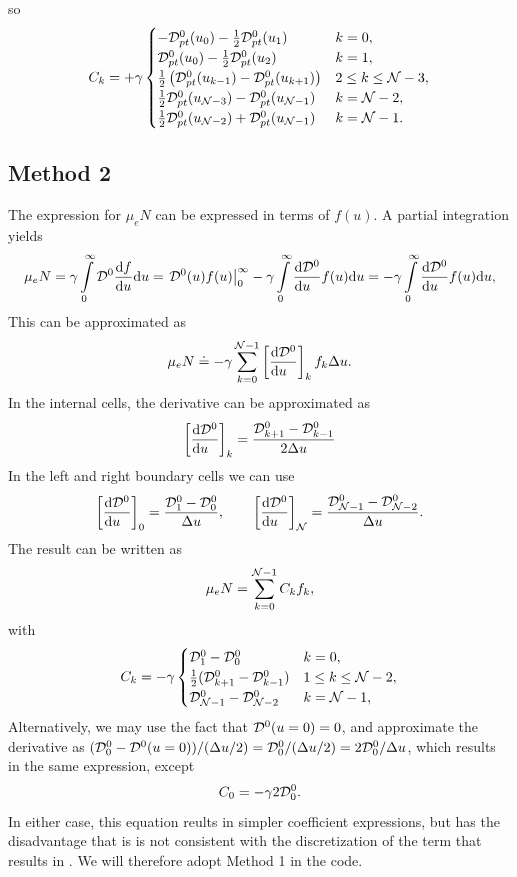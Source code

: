 \documentclass{book}
\begin{document}
so
\begin{equation}
	C_k = +\gamma\begin{cases}
			-{\cal D}_{pt}^0(u_0) - \frac{1}{2}{\cal D}_{pt}^0(u_1)          & k=0, \\
			 {\cal D}_{pt}^0(u_0) - \frac{1}{2}{\cal D}_{pt}^0(u_2)          & k=1, \\
			 \frac{1}{2}\left({\cal D}_{pt}^0(u_{k-1}) - {\cal D}_{pt}^0(u_{k+1})\right)  & 2\leq k \leq {{\cal N}-3}, \\
			 \frac{1}{2}{\cal D}_{pt}^0(u_{{\cal N}-3}) - {\cal D}_{pt}^0(u_{{\cal N}-1}) & k={{\cal N}-2}, \\
			 \frac{1}{2}{\cal D}_{pt}^0(u_{{\cal N}-2}) + {\cal D}_{pt}^0(u_{{\cal N}-1}) & k={{\cal N}-1}.
	\end{cases}
\end{equation}

\subsection*{Method 2}
The expression for $\mu_eN$ can be expressed in terms of $f(u)$. A partial integration yields
\[
	\mu_eN
		= \gamma\int\limits_0^\infty {\cal D}^0 \DERIV{f}{u}\dd{u}
		= \left. {\cal D}^0(u)f(u)\right|_0^\infty - \gamma\int\limits_0^\infty \DERIV{{\cal D}^0}{u} f(u)\dd{u}
		=  - \gamma\int\limits_0^\infty \DERIV{{\cal D}^0}{u} f(u)\dd{u},
\]
This can be approximated as
\[
	\mu_eN \doteq -\gamma\sum\limits_{k=0}^{{\cal N}-1}\left[\DERIV{{\cal D}^0}{u}\right]_kf_k\Delta u.
\]
In the internal cells, the derivative can be approximated as
\[
	\left[\DERIV{{\cal D}^0}{u}\right]_k = \frac{{\cal D}^0_{k+1}-{\cal D}^0_{k-1}}{2\Delta u}
\]
In the left and right boundary cells we can use
\[
	\left[\DERIV{{\cal D}^0}{u}\right]_0 = \frac{{\cal D}^0_{1}-{\cal D}^0_{0}}{\Delta u},
	\quad
	\quad
	\left[\DERIV{{\cal D}^0}{u}\right]_{\cal N} = \frac{{\cal D}^0_{{\cal N}-1}-{\cal D}^0_{{\cal N}-2}}{\Delta u}.
\]
The result can be written as
\begin{equation}
	\mu_eN = \sum\limits_{k=0}^{{\cal N}-1}C_kf_k,
\end{equation}
with
\begin{equation}
	C_k = -\gamma\begin{cases}
			{\cal D}^0_{1}-{\cal D}^0_{0} & k=0, \\
			\frac{1}{2}({\cal D}^0_{k+1}-{\cal D}^0_{k-1}) & 1\leq k \leq {{\cal N}-2}, \\
			{\cal D}^0_{{\cal N}-1}-{\cal D}^0_{{\cal N}-2} & k={{\cal N}-1},
	\end{cases}
\end{equation}
Alternatively, we may use the fact that ${\cal D}^0(u=0)=0$, and approximate the derivative as
$({\cal D}^0_{0}-{\cal D}^0(u=0))/(\Delta u/2) ={\cal D}^0_{0}/(\Delta u/2)=2{\cal D}^0_{0}/\Delta u$,
which results in the same expression, except
\[
	C_0 = -\gamma 2{\cal D}^0_{0}.
\]
In either case, this equation reults in simpler coefficient expressions, but has the disadvantage that
is is not consistent with the discretization of the term that results in . We
will therefore adopt Method 1 in the code.
\end{document}
